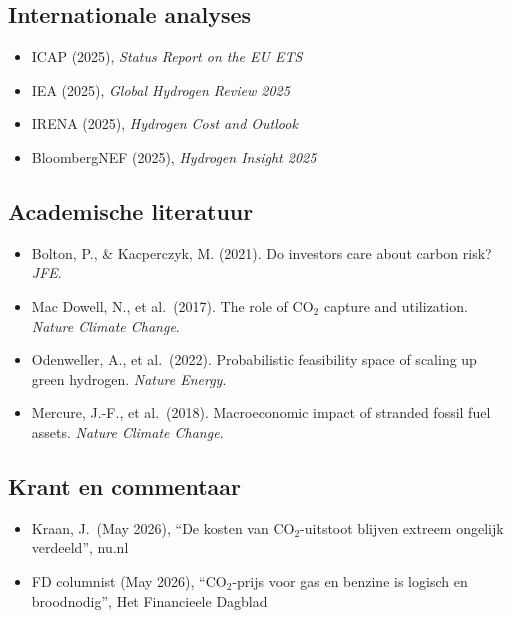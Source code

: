 \documentclass[11pt,a4paper]{article}
\begin{document}
\subsection{Internationale analyses}
\begin{itemize}
  \item ICAP (2025), \emph{Status Report on the EU ETS}
  \item IEA (2025), \emph{Global Hydrogen Review 2025}
  \item IRENA (2025), \emph{Hydrogen Cost and Outlook}
  \item BloombergNEF (2025), \emph{Hydrogen Insight 2025}
\end{itemize}

\subsection{Academische literatuur}
\begin{itemize}
  \item Bolton, P., \& Kacperczyk, M. (2021). Do investors care about carbon risk? \emph{JFE}.
  \item Mac Dowell, N., et al.\ (2017). The role of CO$_2$ capture and utilization. \emph{Nature Climate Change}.
  \item Odenweller, A., et al.\ (2022). Probabilistic feasibility space of scaling up green hydrogen. \emph{Nature Energy}.
  \item Mercure, J.-F., et al.\ (2018). Macroeconomic impact of stranded fossil fuel assets. \emph{Nature Climate Change}.
\end{itemize}

\subsection{Krant en commentaar}
\begin{itemize}
  \item Kraan, J.\ (May 2026), ``De kosten van CO$_2$-uitstoot blijven extreem ongelijk verdeeld'', nu.nl
  \item FD columnist (May 2026), ``CO$_2$-prijs voor gas en benzine is logisch en broodnodig'', Het Financieele Dagblad
\end{itemize}
\end{document}
